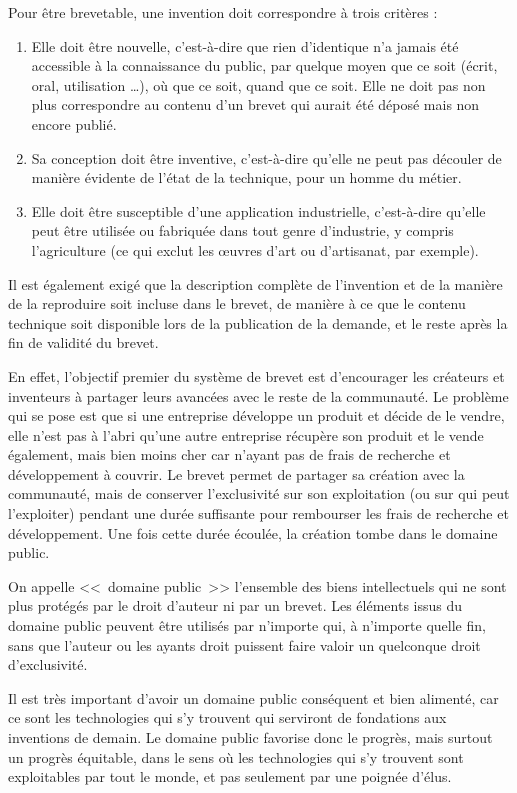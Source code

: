 Pour être brevetable, une invention doit correspondre à trois critères :
\begin{enumerate}
\item Elle doit être nouvelle, c'est-à-dire que rien d'identique n'a jamais été accessible à la connaissance du public, par quelque moyen que ce soit (écrit, oral, utilisation \dots{}), où que ce soit, quand que ce soit. Elle ne doit pas non plus correspondre au contenu d'un brevet qui aurait été déposé mais non encore publié.
\item Sa conception doit être inventive, c'est-à-dire qu'elle ne peut pas découler de manière évidente de l'état de la technique, pour un homme du métier.
\item Elle doit être susceptible d'une application industrielle, c'est-à-dire qu'elle peut être utilisée ou fabriquée dans tout genre d'industrie, y compris l'agriculture (ce qui exclut les œuvres d'art ou d'artisanat, par exemple).
\end{enumerate}\bigskip

Il est également exigé que la description complète de l'invention et de la manière de la reproduire soit incluse dans le brevet, de manière à ce que le contenu technique soit disponible lors de la publication de la demande, et le reste après la fin de validité du brevet.

En effet, l'objectif premier du système de brevet est d'encourager les créateurs et inventeurs à partager leurs avancées avec le reste de la communauté.
Le problème qui se pose est que si une entreprise développe un produit et décide de le vendre, elle n'est pas à l'abri qu'une autre entreprise récupère son produit et le vende également, mais bien moins cher car n'ayant pas de frais de recherche et développement à couvrir.
Le brevet permet de partager sa création avec la communauté, mais de conserver l'exclusivité sur son exploitation (ou sur qui peut l'exploiter) pendant une durée suffisante pour rembourser les frais de recherche et développement.
Une fois cette durée écoulée, la création tombe dans le domaine public.

On appelle <<~domaine public~>> l'ensemble des biens intellectuels qui ne sont plus protégés par le droit d'auteur ni par un brevet.
Les éléments issus du domaine public peuvent être utilisés par n'importe qui, à n'importe quelle fin, sans que l'auteur ou les ayants droit puissent faire valoir un quelconque droit d'exclusivité.

Il est très important d'avoir un domaine public conséquent et bien alimenté, car ce sont les technologies qui s'y trouvent qui serviront de fondations aux inventions de demain.
Le domaine public favorise donc le progrès, mais surtout un progrès équitable, dans le sens où les technologies qui s'y trouvent sont exploitables par tout le monde, et pas seulement par une poignée d'élus.

